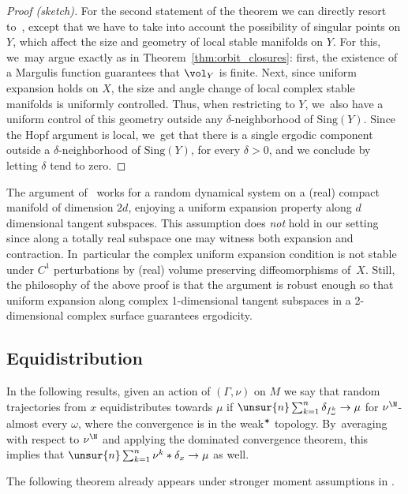 \begin{proof}[Proof (sketch)]
For the second statement of the theorem we can directly resort to~\cite{liu_thesis, chung}, except that
we have to take into account the possibility of singular points on $Y$, which affect the size and geometry of local stable manifolds on $Y$. For this, we~may argue exactly as in Theorem~\ref{thm:orbit_closures}:
first, the existence of a Margulis function guarantees that $\vol_Y$ is finite. Next, since
uniform expansion holds on $X$, the size and angle change of local complex stable manifolds is uniformly controlled. Thus, when restricting to $Y$, we~also have a uniform control of this geometry outside any
$\delta$-neighborhood of $\mathrm{Sing}(Y)$. Since the Hopf argument is local, we~get that there is a single
ergodic component outside a $\delta$-neighborhood of $\mathrm{Sing}(Y)$, for every $\delta>0$, and we conclude by letting $\delta$ tend to zero.
\end{proof}

\begin{rem}
The argument of~\cite{dolgopyat-krikorian} works for a random dynamical system on a (real) compact
manifold of dimension $2d$, enjoying a uniform expansion property
along $d$ dimensional tangent subspaces. This assumption
does \emph{not} hold in our setting since along a totally real subspace one
may witness both expansion and
contraction. In~particular the complex uniform expansion condition is not stable under
$C^1$ perturbations by (real) volume preserving diffeomorphisms of~$X$.
Still, the philosophy of the above proof is that
the argument is robust enough so that uniform expansion along complex 1-dimensional
tangent subspaces in a 2-dimensional complex surface guarantees ergodicity.
\end{rem}

\subsection{Equidistribution}

In the following results, given an action of $(\Gamma, \nu)$ on $M$
we say
that random trajectories from $x$ equidistributes towards
$\mu$ if
$\unsur{n}\sum_{k=1}^n \delta_{f^k_\omega} \to \mu$ for $\nu^\N$-almost every
$\omega$, where the convergence is in the
weak$^\varstar$ topology. By~averaging with respect to $\nu^\N$ and applying
the dominated convergence theorem, this implies that
$\unsur{n}\sum_{k=1}^n \nu^k\ast\delta_x\to\mu$ as well.

The following theorem already appears under stronger moment assumptions in \cite[Th.\,D]{chung}.

